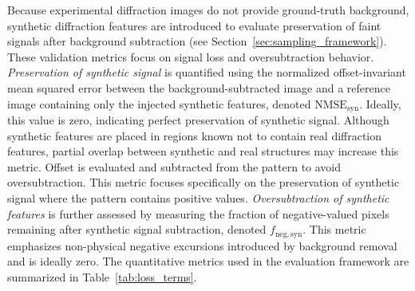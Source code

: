 \documentclass[iucr]{iucrjournals}
\begin{document}
Because experimental diffraction images do not provide ground-truth background, synthetic diffraction features are introduced to evaluate preservation of faint signals after background subtraction (see Section~\ref{sec:sampling_framework}). These validation metrics focus on signal loss and oversubtraction behavior. \textit{Preservation of synthetic signal} is quantified using the normalized offset-invariant mean squared error between the background-subtracted image and a reference image containing only the injected synthetic features, denoted $\mathrm{NMSE}_{\mathrm{syn}}$. Ideally, this value is zero, indicating perfect preservation of synthetic signal. Although synthetic features are placed in regions known not to contain real diffraction features, partial overlap between synthetic and real structures may increase this metric. Offset is evaluated and subtracted from the pattern to avoid oversubtraction. This metric focuses specifically on the preservation of synthetic signal where the pattern contains positive values. \textit{Oversubtraction of synthetic features} is further assessed by measuring the fraction of negative-valued pixels remaining after synthetic signal subtraction, denoted $f_{\mathrm{neg,syn}}$. This metric emphasizes non-physical negative excursions introduced by background removal and is ideally zero. The quantitative metrics used in the evaluation framework are summarized in Table~\ref{tab:loss_terms}.
\end{document}
